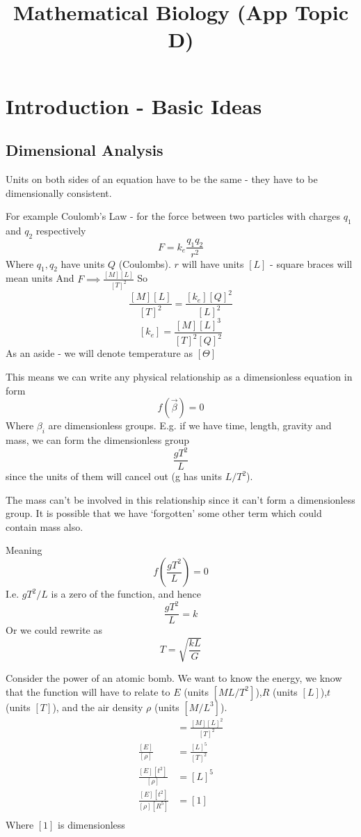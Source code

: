 \documentclass{X:/Documents/Coding/Latex/myassignment}
\title{Mathematical Biology (App Topic D)}
\begin{document}
\maketitle

\section{Introduction - Basic Ideas}


\subsection{Dimensional Analysis}
Units on both sides of an equation have to be the same - they have to be dimensionally consistent.

For example Coulomb's Law - for the force between two particles with charges $q_1$ and $q_2$ respectively
\[F = k_e \frac{q_1q_2}{r^2}\]
Where $q_1,q_2$ have units $Q$ (Coulombs). $r$ will have units $[L]$ - square braces will mean units
And $F \implies \frac{[M][L]}{[T]^2}$
So
\[ \frac{[M][L]}{[T]^2} = \frac{[k_e][Q]^2}{[L]^2}\]
\[[k_e] = \frac{[M][L]^3}{[T]^2[Q]^2}\]
As an aside - we will denote temperature as $[\Theta]$

This means we can write any physical relationship as a dimensionless equation in form
\[f(\vec \beta) = 0\]
Where $\beta_i$ are dimensionless groups.
E.g. if we have time, length, gravity and mass, we can form the dimensionless group
\[\frac{gT^2}{L}\] since the units of them will cancel out (g has units $L/T^2$).

The mass can't be involved in this relationship since it can't form a dimensionless group. It is possible that we have `forgotten' some other term which could contain mass also.

Meaning 
\[f(\frac{gT^2}{L}) = 0\]
I.e. $gT^2/L$ is a zero of the function, and hence
\[\frac{gT^2}{L} = k\]
Or we could rewrite as
\[T = \sqrt{\frac{kL}{G}}\]


Consider the power of an atomic bomb. 
We want to know the energy, we know that the function will have to relate to $E$ (units $[ML/T^2]$),$R$ (units $[L]$),$t$ (units $[T]$), and the air density $\rho$ (units $[M/L^3]$).
\begin{align*}
	[E] &= \frac{[M][L]^2}{[T]^2}\\
	\frac{[E]}{[\rho]} &= \frac{[L]^5}{[T]^2}\\
	\frac{[E][t^2]}{[\rho]} &= [L]^5\\
	\frac{[E][t^2]}{[\rho][R^5]} &= [1]\\
\end{align*}
Where $[1]$ is dimensionless
\end{document}
